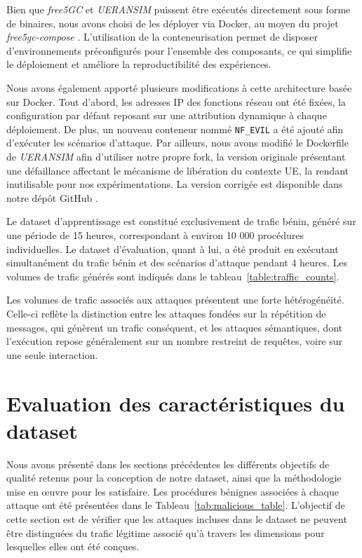 \documentclass[a4paper,11pt,twoside]{StyleThese}
\begin{document}
Bien que \textit{free5GC} et \textit{UERANSIM} puissent être exécutés directement sous forme de binaires, nous avons choisi de les déployer via Docker, au moyen du projet \textit{free5gc-compose} \cite{free5gc_compose}. L’utilisation de la conteneurisation permet de disposer d’environnements préconfigurés pour l’ensemble des composants, ce qui simplifie le déploiement et améliore la reproductibilité des expériences.

Nous avons également apporté plusieurs modifications à cette architecture basée sur Docker. Tout d’abord, les adresses IP des fonctions réseau ont été fixées, la configuration par défaut reposant sur une attribution dynamique à chaque déploiement. De plus, un nouveau conteneur nommé \texttt{NF\_EVIL} a été ajouté afin d’exécuter les scénarios d’attaque. Par ailleurs, nous avons modifié le Dockerfile de \textit{UERANSIM} afin d’utiliser notre propre fork, la version originale présentant une défaillance affectant le mécanisme de libération du contexte UE, la rendant inutilisable pour nos expérimentations. La version corrigée est disponible dans notre dépôt GitHub \cite{fork_free5gc}.

Le dataset d’apprentissage est constitué exclusivement de trafic bénin, généré sur une période de 15 heures, correspondant à environ 10 000 procédures individuelles. Le dataset d’évaluation, quant à lui, a été produit en exécutant simultanément du trafic bénin et des scénarios d’attaque pendant 4 heures. Les volumes de trafic générés sont indiqués dans le tableau~\ref{table:traffic_counts}.

Les volumes de trafic associés aux attaques présentent une forte hétérogénéité. Celle-ci reflète la distinction entre les attaques fondées sur la répétition de messages, qui génèrent un trafic conséquent, et les attaques sémantiques, dont l’exécution repose généralement sur un nombre restreint de requêtes, voire sur une seule interaction.

\section{Evaluation des caractéristiques du dataset}
Nous avons présenté dans les sections précédentes les différents objectifs de qualité retenus pour la conception de notre dataset, ainsi que la méthodologie mise en œuvre pour les satisfaire. Les procédures bénignes associées à chaque attaque ont été présentées dans le Tableau~\ref{tab:malicious_table}. L’objectif de cette section est de vérifier que les attaques incluses dans le dataset ne peuvent être distinguées du trafic légitime associé qu’à travers les dimensions pour lesquelles elles ont été conçues. 
\end{document}
